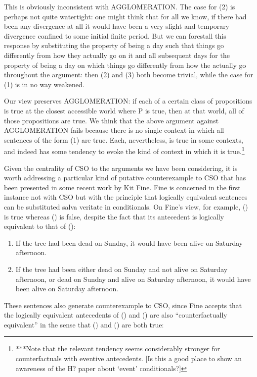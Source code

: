 This is obviously inconsistent with AGGLOMERATION. The case for (2) is
perhaps not quite watertight: one might think that for all we know, if
there had been any divergence at all it would have been a very slight
and temporary divergence confined to some initial finite period. But we
can forestall this response by substituting the property of being a day
such that things go differently from how they actually go on it and all
subsequent days for the property of being a day on which things go
differently from how the actually go throughout the argument: then (2)
and (3) both become trivial, while the case for (1) is in no way
weakened.

Our view preserves AGGLOMERATION: if each of a certain class of
propositions is true at the closest accessible world where P is true,
then at that world, all of those propositions are true. We think that
the above argument against AGGLOMERATION fails because there is no
single context in which all sentences of the form (1) are true. Each,
nevertheless, is true in some contexts, and indeed has some tendency to
evoke the kind of context in which it is true.\footnote{***Note that the
  relevant tendency seems considerably stronger for counterfactuals with
  eventive antecedents. {[}Is this a good place to show an awareness of
  the H? paper about `event' conditionals?{]}}

Given the centrality of CSO to the arguments we have been considering,
it is worth addressing a particular kind of putative counterexample to
CSO that has been presented in some recent work by Kit Fine. Fine is
concerned in the first instance not with CSO but with the principle that
logically equivalent sentences can be substituted salva veritate in
conditionals. On Fine's view, for example, () is true whereas () is
false, despite the fact that its antecedent is logically equivalent to
that of ():

\begin{enumerate}
\def\labelenumi{(\arabic{enumi})}
\setcounter{enumi}{56}
\item
  If the tree had been dead on Sunday, it would have been alive on
  Saturday afternoon.
\item
  If the tree had been either dead on Sunday and not alive on Saturday
  afternoon, or dead on Sunday and alive on Saturday afternoon, it would
  have been alive on Saturday afternoon.
\end{enumerate}

These sentences also generate counterexample to CSO, since Fine accepts
that the logically equivalent antecedents of () and () are also
``counterfactually equivalent'' in the sense that () and () are both
true:


